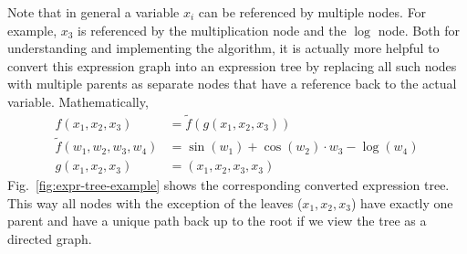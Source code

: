 Note that in general a variable $x_i$ can be referenced by multiple nodes.
For example, $x_3$ is referenced by the multiplication node and the $\log$ node.
Both for understanding and implementing the algorithm,
it is actually more helpful to convert this expression graph into an expression tree
by replacing all such nodes with multiple parents as separate nodes
that have a reference back to the actual variable.
Mathematically,
\begin{align}
    f(x_1, x_2, x_3) &= \tilde{f}(g(x_1, x_2, x_3)) \label{eq:f-tree-example} \\
    \tilde{f}(w_1, w_2, w_3, w_4) &= \sin(w_1) + \cos(w_2) \cdot w_3 - \log(w_4) \nonumber \\
    g(x_1, x_2, x_3) &= (x_1, x_2, x_3, x_3) \nonumber
\end{align}
Fig.~\ref{fig:expr-tree-example} shows the corresponding converted expression tree.
This way all nodes with the exception of the leaves ($x_1,x_2,x_3$) have exactly one parent
and have a unique path back up to the root if we view the tree as a directed graph.

